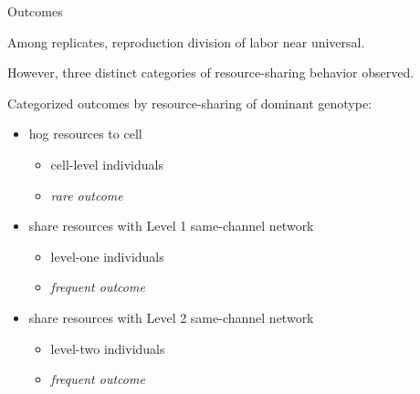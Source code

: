 \begin{frame}{Outcomes}

Among replicates, reproduction division of labor near universal.

\vspace{2ex}

However, three distinct categories of resource-sharing behavior observed.

\vspace{2ex}

Categorized outcomes by resource-sharing of dominant genotype:
\begin{itemize}[+-]
\item hog resources to cell
\pause
\begin{itemize}
\item cell-level individuals
\item \textit{rare outcome}
\end{itemize}
\item share resources with Level 1 same-channel network
\pause
\begin{itemize}
\item level-one individuals
\item \textit{frequent outcome}
\end{itemize}
\item share resources with Level 2 same-channel network
\pause
\begin{itemize}
\item level-two individuals
\item \textit{frequent outcome}
\end{itemize}
\end{itemize}

\end{frame}

